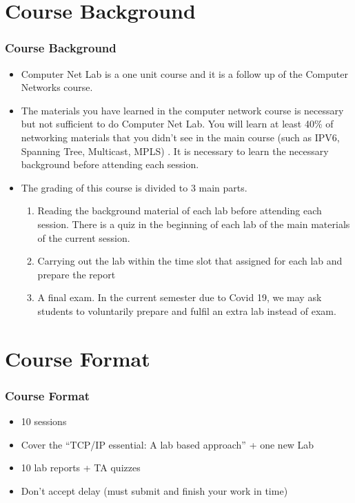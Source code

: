 \documentclass[15pt]{beamer}
\begin{document}
\section{Course Background}
\begin{frame}
    \frametitle{Course Background}

    \begin{itemize}
        \item Computer Net Lab is a one unit course and it is a follow up of the Computer Networks course.
        \item The materials you have learned in the computer network course is necessary but not sufficient to do Computer Net Lab.
              You will learn at least 40\% of networking materials that you didn't see in the main course (such as IPV6, Spanning Tree, Multicast, MPLS) . It is necessary to learn the necessary background before attending each session.
        \item The grading of this course is divided to 3 main parts.
        \begin{enumerate}
            \item Reading the background material of each lab before attending each session. There is a quiz in the beginning of each lab of the main materials of the current session.
            \item Carrying out the lab within the time slot that assigned for each lab and prepare the report
            \item A final exam. In the current semester due to Covid 19, we may ask students to voluntarily prepare and fulfil an extra lab instead of exam.
        \end{enumerate}
    \end{itemize}


\end{frame}

\section{Course Format}
\begin{frame}
    \frametitle{Course Format}

    \begin{itemize}
        \item 10 sessions
        \item Cover the “TCP/IP essential: A lab based approach” + one new Lab
        \item 10 lab reports + TA quizzes
        \item {\color{red} Don’t accept delay (must submit and finish your work in time)}
    \end{itemize}

\end{frame}
\end{document}
